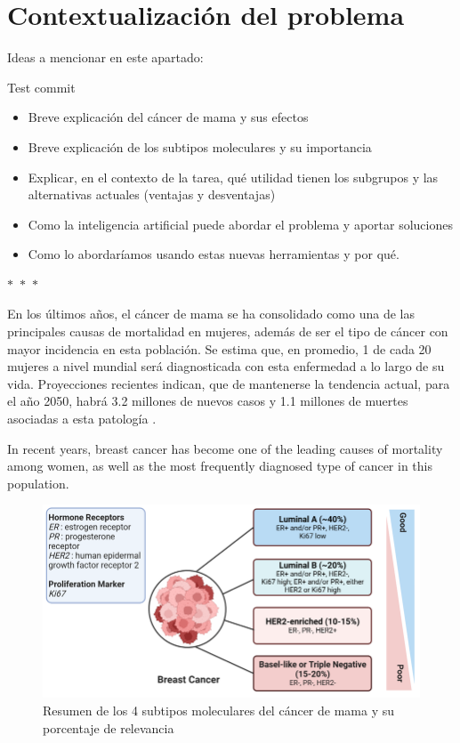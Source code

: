\documentclass[a4paper,10pt]{book}
\begin{document}
\section{Contextualización del problema}


Ideas a mencionar en este apartado:

Test commit

\begin{itemize}
  \item Breve explicación del cáncer de mama y sus efectos
  \item Breve explicación de los subtipos moleculares y su importancia
  \item Explicar, en el contexto de la tarea, qué utilidad tienen los subgrupos y las alternativas actuales (ventajas y desventajas)
  \item Como la inteligencia artificial puede abordar el problema y aportar soluciones
  \item Como lo abordaríamos usando estas nuevas herramientas y por qué.
\end{itemize}

\begin{center}
  $\ast$~$\ast$~$\ast$
\end{center}

En los últimos años, el cáncer de mama se ha consolidado como una de las principales causas de mortalidad en mujeres, además de ser el tipo de cáncer con mayor incidencia en esta población. Se estima que, en promedio, 1 de cada 20 mujeres a nivel mundial será diagnosticada con esta enfermedad a lo largo de su vida. Proyecciones recientes indican, que de mantenerse la tendencia actual, para el año 2050, habrá 3.2 millones de nuevos casos y 1.1 millones de muertes asociadas a esta patología \cite{kim_global_2025}.

In recent years, breast cancer has become one of the leading causes of mortality among women, as well as the most frequently diagnosed type of cancer in this population.



\begin{figure}
    \centering
    \includegraphics[width=0.8\linewidth]{reports/assets/subtypes.png}
    \caption{Resumen de los 4 subtipos moleculares del cáncer de mama y su porcentaje de relevancia \cite{harnessing_2024}}
    \label{fig:subtypes}
\end{figure}
\end{document}

